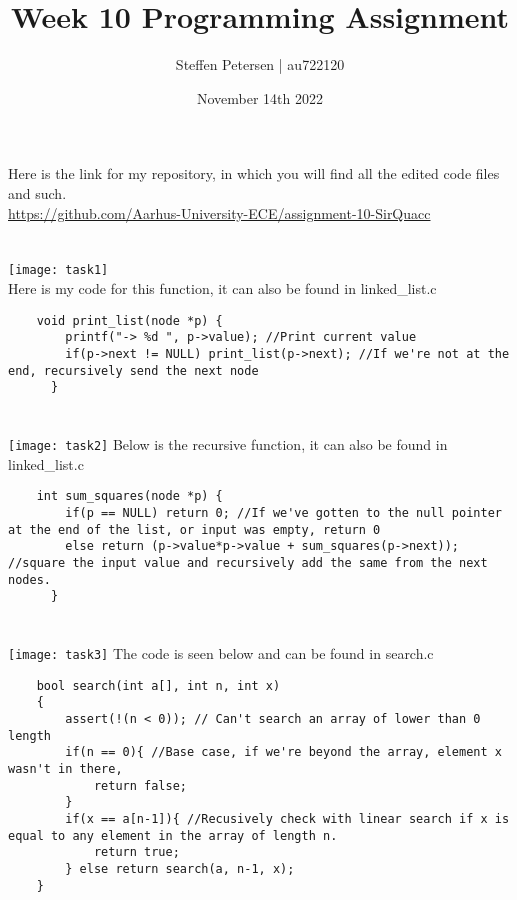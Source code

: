 \documentclass{article}
\title{Week 10 Programming Assignment}
\author{Steffen Petersen | au722120}
\date{November 14th 2022}
\begin{document}

\maketitle
\vspace{5pt}
\noindent Here is the link for my repository, in which you will find all the edited code files and such.\\
\url{https://github.com/Aarhus-University-ECE/assignment-10-SirQuacc}
\section{}
\texttt{[image: task1]}
\vspace{2pt}\\
Here is my code for this function, it can also be found in linked\_list.c
\begin{lstlisting}
    void print_list(node *p) {
        printf("-> %d ", p->value); //Print current value
        if(p->next != NULL) print_list(p->next); //If we're not at the end, recursively send the next node
      }
\end{lstlisting}


\section{}
\texttt{[image: task2]}
\vspace{2pt}
Below is the recursive function, it can also be found in linked\_list.c
\begin{lstlisting}
    int sum_squares(node *p) {
        if(p == NULL) return 0; //If we've gotten to the null pointer at the end of the list, or input was empty, return 0
        else return (p->value*p->value + sum_squares(p->next)); //square the input value and recursively add the same from the next nodes.
      }
\end{lstlisting}


\section{}
\texttt{[image: task3]} 
The code is seen below and can be found in search.c
\begin{lstlisting}
    bool search(int a[], int n, int x)
    {
        assert(!(n < 0)); // Can't search an array of lower than 0 length
        if(n == 0){ //Base case, if we're beyond the array, element x wasn't in there,
            return false;
        }
        if(x == a[n-1]){ //Recusively check with linear search if x is equal to any element in the array of length n.
            return true;
        } else return search(a, n-1, x);
    }
\end{lstlisting}
\vspace{1cm}
\end{document}
